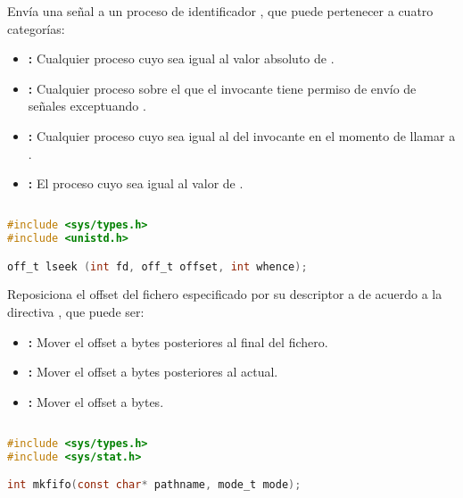 Envía una señal  a un proceso de identificador , que puede pertenecer a cuatro categorías:

\begin{itemize}
	\item{}\textbf{:} Cualquier proceso cuyo  sea igual al valor absoluto de .
	\item{}\textbf{:} Cualquier proceso sobre el que el invocante tiene permiso de envío de señales exceptuando .
	\item{}\textbf{:} Cualquier proceso cuyo  sea igual al del invocante en el momento de llamar a .
	\item{}\textbf{:} El proceso cuyo  sea igual al valor de .
\end{itemize}

\subsection{}\label{lseek}

\begin{lstlisting}[language=C]
#include <sys/types.h>
#include <unistd.h>

off_t lseek (int fd, off_t offset, int whence);
\end{lstlisting}

Reposiciona el offset del fichero especificado por su descriptor  a  de acuerdo a la directiva , que puede ser:

\begin{itemize}
	\item{}\textbf{:} Mover el offset a  bytes posteriores al final del fichero.
	\item{}\textbf{:} Mover el offset a  bytes posteriores al actual.
	\item{}\textbf{:} Mover el offset a  bytes.
\end{itemize}

\subsection{}\label{mkfifo}

\begin{lstlisting}[language=C]
#include <sys/types.h>
#include <sys/stat.h>

int mkfifo(const char* pathname, mode_t mode);
\end{lstlisting}

